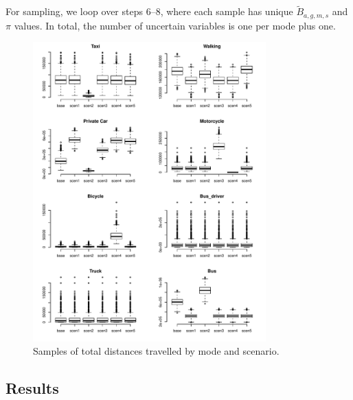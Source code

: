 \documentclass{article}
\begin{document}
\begin{appendix}
For sampling, we loop over steps 6--8, where each sample has unique $\tilde{B}_{a,g,m,s}$ and $\pi$ values. In total, the number of uncertain variables is one per mode plus one. %






\begin{figure}[h]
\includegraphics[width=0.8\textwidth]{distances_beta.pdf}
\caption{\small Samples of total distances travelled by mode and scenario.}
\label{distances_beta}
\end{figure}


\clearpage


\subsection{Results}



\end{appendix}
\end{document}
